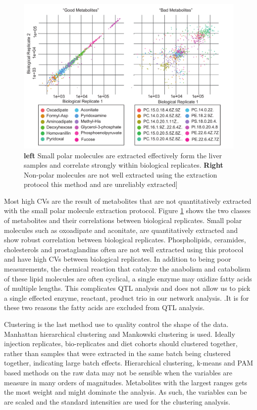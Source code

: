 \documentclass[a4paper,11pt,twoside]{book}
\begin{document}
	\begin{figure}[bh!t]
		\centering
		\includegraphics[width=\linewidth]{3.Metabolomics/Good_and_Bad_Metabolites.pdf}
		\caption{ \textbf{left} Small polar molecules are extracted effectively form the liver samples and correlate strongly within biological replicates. \textbf{Right} Non-polar molecules are not well extracted using the extraction protocol this method and are unreliably extracted] }
		\label{Fig:Good and Bad Metabs}
	\end{figure}
	
	Most high CVs are the result of metabolites that are not quantitatively extracted with the small polar molecule extraction protocol. Figure \ref{Fig:Good and Bad Metabs}  shows the two classes of metabolites and their correlations between biological replicates. Small polar molecules such as oxoadipate and aconitate, are quantitatively extracted and show robust correlation between biological replicates. Phospholipids, ceramides, cholesterols and prostaglandins often are not well extracted using this protocol and have high CVs between biological replicates. In addition to being poor measurements, the chemical reaction that catalyze the anabolism and catabolism of these lipid molecules are often cyclical, a single enzyme may oxidize fatty acids of multiple lengths. This complicates QTL analysis and does not allow us to pick a single effected enzyme, reactant, product trio in our network analysis. .It is for these two reasons the fatty acids are excluded from QTL analysis.
	
	Clustering is the last method use to quality control the shape of the data. Manhattan hierarchical clustering and Mankowski clustering is used. Ideally injection replicates, bio-replicates and diet cohorts should clustered together, rather than samples that were extracted in the same batch being clustered together, indicating large batch effects. Hierarchical clustering, k-means and PAM based methods on the raw data may not be sensible when the variables are measure in many orders of magnitudes. Metabolites with the largest ranges gets the most weight and might dominate the analysis. As such, the variables can be are scaled and the standard intensities are used for the clustering analysis.
	
\end{document}
